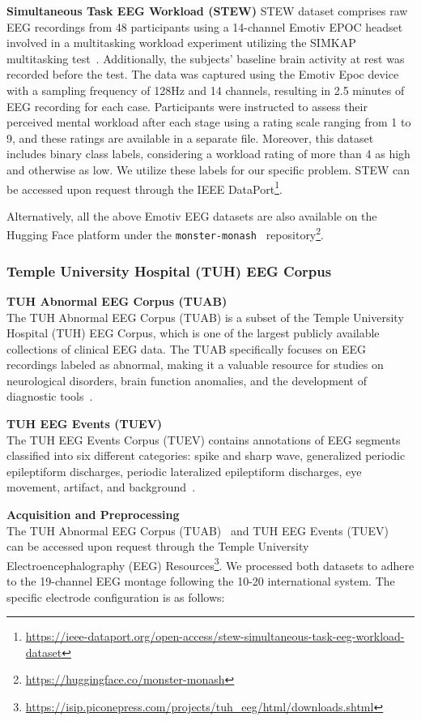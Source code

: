 \documentclass{article} %
\begin{document}
\noindent\textbf{Simultaneous Task EEG Workload (STEW)}
STEW dataset comprises raw EEG recordings from 48 participants using a 14-channel Emotiv EPOC headset involved in a multitasking workload experiment utilizing the SIMKAP multitasking test~\citep{stew}. Additionally, the subjects' baseline brain activity at rest was recorded before the test. The data was captured using the Emotiv Epoc device with a sampling frequency of 128Hz and 14 channels, resulting in 2.5 minutes of EEG recording for each case. Participants were instructed to assess their perceived mental workload after each stage using a rating scale ranging from 1 to 9, and these ratings are available in a separate file. Moreover, this dataset includes binary class labels, considering a workload rating of more than 4 as high and otherwise as low. We utilize these labels for our specific problem. STEW can be accessed upon request through the IEEE DataPort\footnote{\url{https://ieee-dataport.org/open-access/stew-simultaneous-task-eeg-workload-dataset}}. 

Alternatively, all the above Emotiv EEG datasets are also available on the Hugging Face platform under the \texttt{monster-monash}~\citep{monster} repository\footnote{\url{https://huggingface.co/monster-monash}}.


\subsubsection{Temple University Hospital (TUH) EEG Corpus}
\noindent\textbf{TUH Abnormal EEG Corpus (TUAB)} \\
The TUH Abnormal EEG Corpus (TUAB) is a subset of the Temple University Hospital (TUH) EEG Corpus, which is one of the largest publicly available collections of clinical EEG data. The TUAB specifically focuses on EEG recordings labeled as abnormal, making it a valuable resource for studies on neurological disorders, brain function anomalies, and the development of diagnostic tools~\citep{TUAB}.


\noindent\textbf{TUH EEG Events (TUEV)} \\
The TUH EEG Events Corpus (TUEV) contains annotations of EEG segments classified into six different categories: spike and sharp wave, generalized periodic epileptiform discharges, periodic lateralized epileptiform discharges, eye movement, artifact, and background~\citep{TUEV}.



\noindent\textbf{Acquisition and Preprocessing}\\
The TUH Abnormal EEG Corpus (TUAB)~\citep{TUAB} and TUH EEG Events (TUEV)~\citep{TUEV} can be accessed upon request through the Temple University Electroencephalography (EEG) Resources\footnote{\url{https://isip.piconepress.com/projects/tuh_eeg/html/downloads.shtml}}. We processed both datasets to adhere to the 19-channel EEG montage following the 10-20 international system. The specific electrode configuration is as follows:
\end{document}
